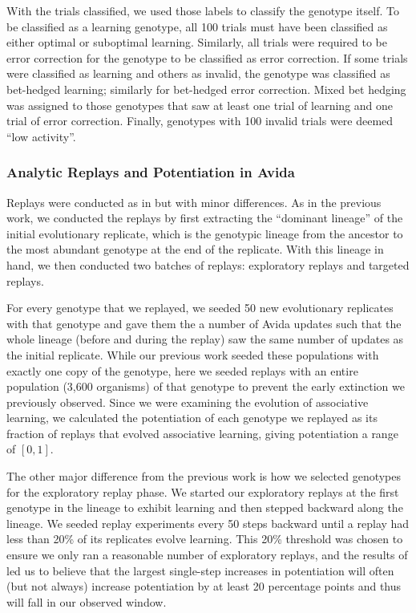With the trials classified, we used those labels to classify the genotype itself. 
To be classified as a learning genotype, all 100 trials must have been classified as either optimal or suboptimal learning. 
Similarly, all trials were required to be error correction for the genotype to be classified as error correction. 
If some trials were classified as learning and others as invalid, the genotype was classified as bet-hedged learning; similarly for bet-hedged error correction. 
Mixed bet hedging was assigned to those genotypes that saw at least one trial of learning and one trial of error correction. 
Finally, genotypes with 100 invalid trials were deemed ``low activity''.


\subsubsection{Analytic Replays and Potentiation in Avida}
\label{subsub:avida:replays}
Replays were conducted as in \cite{fergusonPotentiatingMutationsFacilitate2023} but with minor differences.
As in the previous work, we conducted the replays by first extracting the ``dominant lineage'' of the initial evolutionary replicate, which is the genotypic lineage from the ancestor to the most abundant genotype at the end of the replicate. 
With this lineage in hand, we then conducted two batches of replays: exploratory replays and targeted replays. 

For every genotype that we replayed, we seeded 50 new evolutionary replicates with that genotype and gave them the a number of Avida updates such that the whole lineage (before and during the replay) saw the same number of updates as the initial replicate. 
While our previous work seeded these populations with exactly one copy of the genotype, here we seeded replays with an entire population (3,600 organisms) of that genotype to prevent the early extinction we previously observed. 
Since we were examining the evolution of associative learning, we calculated the potentiation of each genotype we replayed as its fraction of replays that evolved associative learning, giving potentiation a range of $[0, 1]$. 

The other major difference from the previous work is how we selected genotypes for the exploratory replay phase.
We started our exploratory replays at the first genotype in the lineage to exhibit learning and then stepped backward along the lineage. 
We seeded replay experiments every 50 steps backward until a replay had less than 20\% of its replicates evolve learning. 
This 20\% threshold was chosen to ensure we only ran a reasonable number of exploratory replays, and the results of \cite{fergusonPotentiatingMutationsFacilitate2023} led us to believe that the largest single-step increases in potentiation will often (but not always) increase potentiation by at least 20 percentage points and thus will fall in our observed window. 

